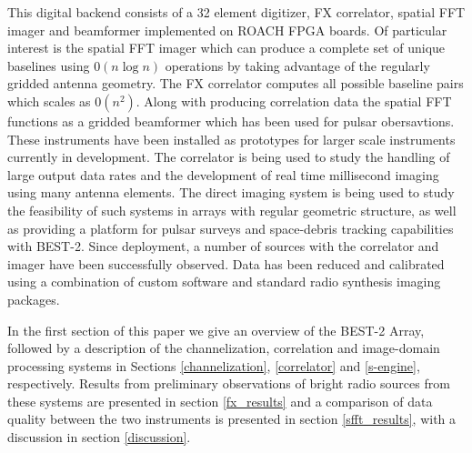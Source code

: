 \documentclass[useAMS,macros,usenatbib,onecolumn]{mn2e}
\begin{document}
This digital backend consists of a 32 element digitizer, FX correlator, spatial FFT imager and beamformer implemented on ROACH FPGA boards.
Of particular interest is the spatial FFT imager which can produce a complete set of unique baselines using $0(n \log n)$ operations by taking advantage of the regularly gridded antenna geometry.
The FX correlator computes all possible baseline pairs which scales as $0(n^2)$.
Along with producing correlation data the spatial FFT functions as a gridded beamformer which has been used for pulsar obersavtions.
These instruments have been installed as prototypes for larger scale instruments currently in development.
The correlator is being used to study the handling of large output data rates and the development of real time millisecond imaging using many antenna elements.
The direct imaging system is being used to study the feasibility of such systems in arrays with regular geometric structure, as well as providing a platform for pulsar surveys and space-debris tracking capabilities with BEST-2.
Since deployment, a number of sources with the correlator and imager have been successfully observed.
Data has been reduced and calibrated using a combination of custom software and standard radio synthesis imaging packages.

In the first section of this paper we give an overview of the BEST-2 Array, followed by a description of the channelization, correlation and image-domain processing systems in Sections \ref{channelization}, \ref{correlator} and \ref{s-engine}, respectively.
Results from preliminary observations of bright radio sources from these systems are presented in section \ref{fx_results} and a comparison of data quality between the two instruments is presented in section \ref{sfft_results}, with a discussion in section \ref{discussion}.
\end{document}
